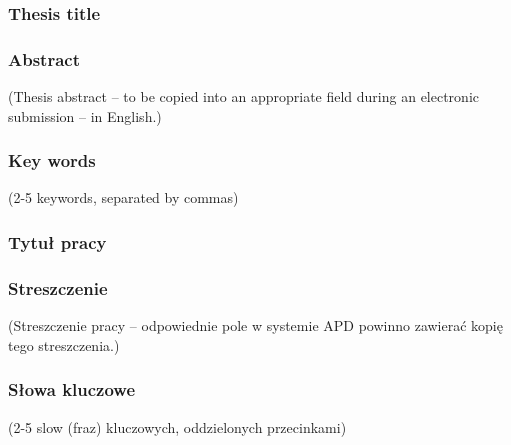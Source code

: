 \documentclass[a4paper,twoside,12pt]{book}
\begin{document}


\cleardoublepage

\rmfamily\normalfont
\pagestyle{empty}



\subsubsection*{Thesis title}  
\Title

\subsubsection*{Abstract} 
(Thesis abstract – to be copied into an appropriate field during an electronic submission – in English.)

\subsubsection*{Key words}  
(2-5 keywords, separated by commas)

\subsubsection*{Tytuł pracy}
\begin{otherlanguage}{polish}
\TitleAlt
\end{otherlanguage}

\subsubsection*{Streszczenie} 
\begin{otherlanguage}{polish}
(Streszczenie pracy – odpowiednie pole w systemie APD powinno zawierać kopię tego streszczenia.)
\end{otherlanguage}

\subsubsection*{Słowa kluczowe} 
\begin{otherlanguage}{polish}
(2-5 slow (fraz) kluczowych, oddzielonych przecinkami)
\end{otherlanguage}
\end{document}
